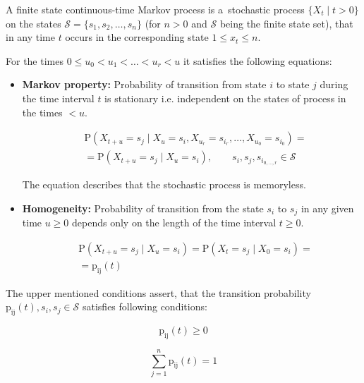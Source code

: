 \documentclass[thesis=M,english]{FITthesis}[2012/10/20]
\begin{document}
A finite state continuous-time Markov process is a~stochastic process $\{ X_t \mid t > 0\}$ on the states $\mathcal{S} = \{ s_1, s_2, \dots, s_n \}$  (for $n>0$ and $\mathcal{S}$ being the finite state set), that in any time $t$  occurs in the corresponding state $1 \leq x_t \leq n$. 

For the times $0 \leq u_0 < u_1 < \dots < u_r < u$ it satisfies the following equations: 
\begin{itemize}
\item \textbf{Markov property:} Probability of transition from state $i$ to state $j$ during the time interval $t$ is stationary i.e. independent on the states of process in the times $< u$.  
    
\begin{equation}
\begin{aligned}
& \mathrm{P}( X_{t+u} = s_j \mid X_u = s_i, X_{u_r} = s_{i_r}, \dots , X_{u_0} = s_{i_0} ) = \\ 
& = \mathrm{P}( X_{t+u} = s_j \mid X_u = s_i ), \qquad s_i,s_j,s_{i_{0,\dots,r}} \in \mathcal{S} 
\end{aligned}
\end{equation}

The equation describes that the stochastic process is memoryless.

\item \textbf{Homogeneity:} Probability of transition from the state $s_i$ to $s_j$ in any given time $u \geq 0$ depends only on the length of the time interval $t \geq 0$. 

\begin{equation}
\begin{aligned}
& \mathrm{P}( X_{t+u} = s_j \mid X_u = s_i ) = \mathrm{P}( X_t = s_j \mid X_0 = s_i ) = \\
& = \mathrm{p_{ij}}(t)
\end{aligned}
\end{equation}

\end{itemize}
 

The upper mentioned conditions assert, that the transition probability $\mathrm{p_{ij}}(t), s_i,s_j \in \mathcal{S}$ satisfies following conditions:%


\begin{equation}
\mathrm{p_{ij}}(t) \geq 0
\end{equation}

\begin{equation}
\sum_{j = 1}^n \mathrm{p_{ij}}(t) = 1
\end{equation}
\end{document}
